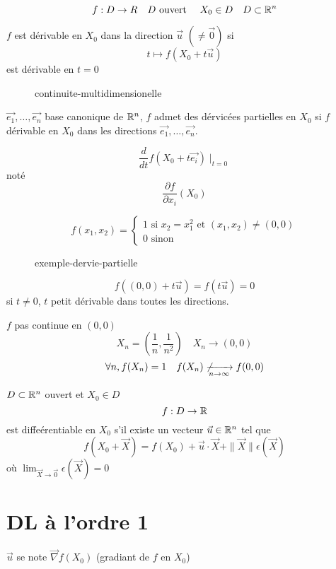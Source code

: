\[
f: D \to R \quad D \text{ ouvert } \quad X_0 \in D \quad D \subset \mathbb{R}^n
\] 

\begin{definition}
    $f$ est dérivable en  $X_0$ dans la direction $\vec{u}$ $(\neq \vec{0})$ si 
    \[
        t \mapsto f(X_0 + t\vec{u})
    \] 
    est dérivable en $t = 0$
\end{definition}
\begin{figure}[H]
    \centering
    \caption{continuite-multidimensionelle}
    \label{fig:continuite-multidimensionelle}
\end{figure}
$\vec{e_1}, \ldots, \vec{e_n}$ base canonique de $\mathbb{R}^n$, $f$ admet des dérvicées partielles en  $X_0$ si $f$ dérivable en  $X_0$ dans les directions $\vec{e_1}, \ldots, \vec{e_n}$.
\par
\[
    \frac{d}{dt} f(X_0 + t \vec{e_i}) \mid_{t = 0}
\] 
noté
\[
\frac{\partial f}{\partial x_i}(X_0)
\] 

\begin{eg}
   \[
   f(x_1, x_2) = \begin{cases}
       1  \text{ si } x_2 = x_1^2 \text{ et } (x_1, x_2) \neq (0, 0)\\
       0 \text{ sinon}
   \end{cases}
   \]  
\begin{figure}[H]
    \centering
    \caption{exemple-dervie-partielle}
    \label{fig:exemple-dervie-partielle}
\end{figure}
\[
    f((0, 0) + t \vec{u}) = f(t \vec{u}) = 0
\] 
si $t\neq 0$, $t$ petit dérivable dans toutes les directions.
\par
$f$ pas continue en  $(0, 0)$
 \[
X_n = (\frac{1}{n}, \frac{1}{n^2}) \quad X_n \to (0, 0)
\] 
\[
\forall n, f(X_n) = 1 \quad f(X_n) \not\xrightarrow[n \to \infty]{} f(0, 0)
\] 
\end{eg}

\begin{definition}
    $D \subset \mathbb{R}^n$ ouvert et $X_0 \in D$
    \[
    f: D \to \mathbb{R}
    \] 
    est diffeérentiable en $X_0$ s'il existe un vecteur $\vec{u} \in \mathbb{R}^n$ tel que 
    \[
        f(X_0 + \vec{X}) = f(X_0) + \vec{u} \cdot \vec{X} + \|\vec{X}\|\epsilon(\vec{X})
    \] 
    où $\lim_{\vec{X} \to \vec{0}} \epsilon(\vec{X}) = 0$
\end{definition}

\section{DL à l'ordre 1}
$\vec{u}$ se note $\vec{\nabla}f(X_0)$ (gradiant de $f$ en  $X_0$)

